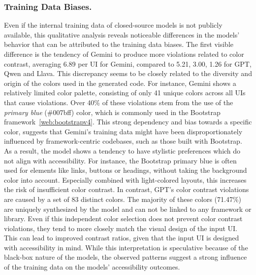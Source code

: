 \subsubsection{Training Data Biases.} Even if the 
internal training data of closed-source models is not publicly 
available, this qualitative analysis reveals noticeable differences 
in the models' behavior that can be attributed to the training 
data biases.\newline
The first visible difference is the tendency of Gemini to produce 
more violations related to color contrast, averaging 
6.89 per UI for Gemini, compared to 5.21, 3.00, 1.26 for GPT,
Qwen and Llava. This discrepancy seems to be closely related to 
the diversity and origin of the colors used in the generated code.
For instance, Gemini shows a relatively limited color palette, 
consisting of only 41 unique colors across all UIs that cause 
violations. Over 40\% of these violations stem from the use 
of the \textit{primary blue} (\#007bff) color, which is 
commonly used in the Bootstrap framework~\ref{web:bootstrapv4}.
This strong dependency and bias towards a specific color, suggests 
that Gemini's training data might have been disproportionately 
influenced by framework-centric codebases, such as those built 
with Bootstrap. As a result, the model shows a tendency to have 
stylistic preferences which do not align with accessibility.
For instance, the Bootstrap primary blue is often used for 
elements like links, buttons or headings, without taking the 
background color into account. Especially combined with 
light-colored layouts, this increases the risk of insufficient 
color contrast. In contrast, GPT's color contrast violations are 
caused by a set of 83 distinct colors. The majority of these 
colors (71.47\%) are uniquely synthesized by the model and can not 
be linked to any framework or library. Even if this 
independent color selection does not prevent color contrast 
violations, they tend to more closely match the visual 
design of the input UI. This can lead to improved contrast ratios,
given that the input UI is designed with accessibility in mind.
While this interpretation is speculative because of the 
black-box nature of the models, the observed patterns suggest 
a strong influence of the training data on the models' accessibility
outcomes.


